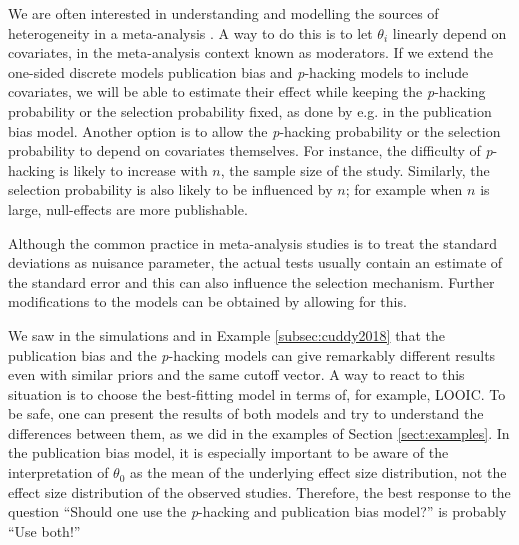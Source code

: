 \documentclass[useAMS,usenatbib,referee]{biom}
\begin{document}
We are often interested in understanding and modelling the sources of heterogeneity in a meta-analysis \citep{thompson1994systematic}. A way to do this is to let $\theta_{i}$ linearly depend on covariates, in the meta-analysis context known as moderators. If we extend the one-sided discrete models publication bias and \textit{p}-hacking models to include covariates, we will be able to estimate their effect while keeping the \textit{p}-hacking probability or the selection probability fixed, as done by e.g. \citet{Vevea1995-on} in the publication bias model. Another option is to allow the \textit{p}-hacking probability or the selection probability to depend on covariates themselves. For instance, the difficulty of \textit{p}-hacking is likely to increase with $n$, the sample size of the study. Similarly, the selection probability is also likely to be influenced by $n$; for example when $n$ is large, null-effects are more publishable.

Although the common practice in meta-analysis studies is to treat the standard deviations as nuisance parameter, the actual tests usually contain an estimate of the standard error and this can also influence the selection mechanism. Further modifications to the models can be obtained by allowing for this. 


We saw in the simulations and in Example \ref{subsec:cuddy2018} that the publication bias and the \textit{p}-hacking models can give remarkably different results even with similar priors and the same cutoff vector. A way to react to this situation is to choose the best-fitting model in terms of, for example, LOOIC. To be safe, one can present the results of both models and try to understand the differences between them, as we did in the examples of Section \ref{sect:examples}. In the publication bias model, it is especially important to be aware of the interpretation of $\theta_{0}$ as the mean of the underlying effect size distribution, not the effect size distribution of the observed studies. Therefore, the best response to the question \enquote{Should one use the \textit{p}-hacking and publication bias model?} is probably \enquote{Use both!}
\end{document}
